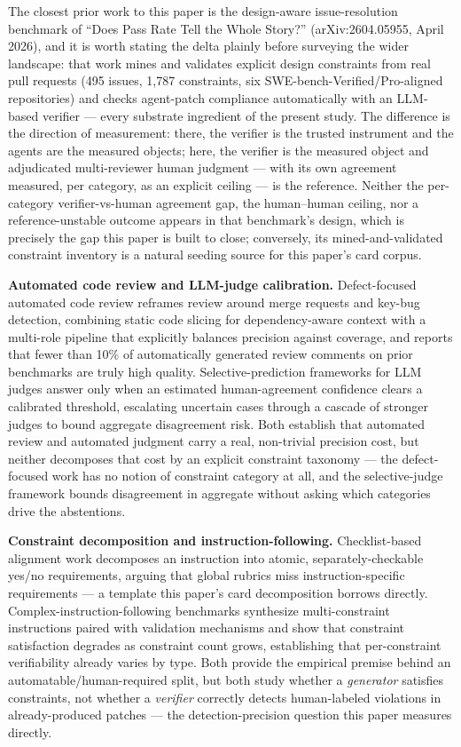 \documentclass[11pt]{article}
\begin{document}
The closest prior work to this paper is the design-aware issue-resolution benchmark of ``Does Pass Rate Tell the Whole Story?'' (arXiv:2604.05955, April 2026), and it is worth stating the delta plainly before surveying the wider landscape: that work mines and validates explicit design constraints from real pull requests (495 issues, 1{,}787 constraints, six SWE-bench-Verified/Pro-aligned repositories) and checks agent-patch compliance automatically with an LLM-based verifier --- every substrate ingredient of the present study. The difference is the direction of measurement: there, the verifier is the trusted instrument and the agents are the measured objects; here, the verifier is the measured object and adjudicated multi-reviewer human judgment --- with its own agreement measured, per category, as an explicit ceiling --- is the reference. Neither the per-category verifier-vs-human agreement gap, the human--human ceiling, nor a reference-unstable outcome appears in that benchmark's design, which is precisely the gap this paper is built to close; conversely, its mined-and-validated constraint inventory is a natural seeding source for this paper's card corpus.

\textbf{Automated code review and LLM-judge calibration.} Defect-focused automated code review reframes review around merge requests and key-bug detection, combining static code slicing for dependency-aware context with a multi-role pipeline that explicitly balances precision against coverage, and reports that fewer than 10\% of automatically generated review comments on prior benchmarks are truly high quality. Selective-prediction frameworks for LLM judges answer only when an estimated human-agreement confidence clears a calibrated threshold, escalating uncertain cases through a cascade of stronger judges to bound aggregate disagreement risk. Both establish that automated review and automated judgment carry a real, non-trivial precision cost, but neither decomposes that cost by an explicit constraint taxonomy --- the defect-focused work has no notion of constraint category at all, and the selective-judge framework bounds disagreement in aggregate without asking which categories drive the abstentions.

\textbf{Constraint decomposition and instruction-following.} Checklist-based alignment work decomposes an instruction into atomic, separately-checkable yes/no requirements, arguing that global rubrics miss instruction-specific requirements --- a template this paper's card decomposition borrows directly. Complex-instruction-following benchmarks synthesize multi-constraint instructions paired with validation mechanisms and show that constraint satisfaction degrades as constraint count grows, establishing that per-constraint verifiability already varies by type. Both provide the empirical premise behind an automatable/human-required split, but both study whether a \emph{generator} satisfies constraints, not whether a \emph{verifier} correctly detects human-labeled violations in already-produced patches --- the detection-precision question this paper measures directly.
\end{document}
